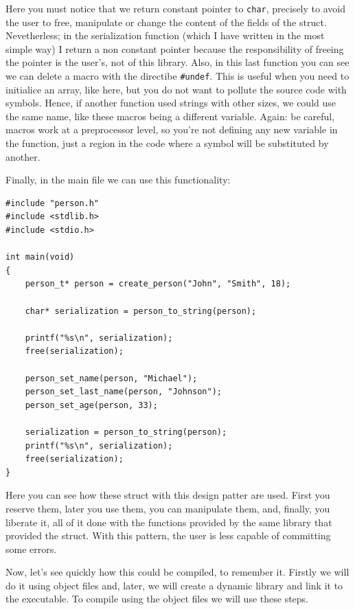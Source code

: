\documentclass[a4paper]{article}
\begin{document}
Here you must notice that we return constant pointer to \verb!char!, precisely
to avoid the user to free, manipulate or change the content of the fields of
the struct. Nevetherless; in the serialization function (which I have written in
the most simple way) I return a non constant pointer because the responsibility
of freeing the pointer is the user's, not of this library. Also, in this last
function you can see we can delete a macro with the directibe \verb!#undef!.
This is useful when you need to initialice an array, like here, but you do not
want to pollute the source code with symbols. Hence, if another function used
strings with other sizes, we could use the same name, like these macros being
a different variable. Again: be careful, macros work at a preprocessor level,
so you're not defining any new variable in the function, just a region in the
code where a symbol will be substituted by another.

Finally, in the main file we can use this functionality:

\noindent
\begin{minipage}[H]{\linewidth}
\mbox{}
\begin{lstlisting}[style=C, label={lst:finalExMain},
caption={Final example of program  -- \texttt{main.c}}]
#include "person.h"
#include <stdlib.h>
#include <stdio.h>

int main(void)
{
    person_t* person = create_person("John", "Smith", 18);

    char* serialization = person_to_string(person);

    printf("%s\n", serialization);
    free(serialization);

    person_set_name(person, "Michael");
    person_set_last_name(person, "Johnson");
    person_set_age(person, 33);

    serialization = person_to_string(person);
    printf("%s\n", serialization);
    free(serialization);
}
\end{lstlisting}
\end{minipage}

Here you can see how these struct with this design patter are used. First you
reserve them, later you use them, you can manipulate them, and, finally, you
liberate it, all of it done with the functions provided by the same library
that provided the struct. With this pattern, the user is less capable of
committing some errors.

Now, let's see quickly how this could be compiled, to remember it. Firstly we
will do it using object files and, later, we will create a dynamic library and
link it to the executable. To compile using the object files we will use these
steps.
\end{document}
